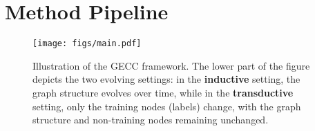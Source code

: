 


\section{Method Pipeline}
\begin{figure}[h]
    \centering
    \texttt{[image: figs/main.pdf]}
    \caption{Illustration of the GECC framework. The lower part of the figure depicts the two evolving settings: in the \textbf{inductive} setting, the graph structure evolves over time, while in the \textbf{transductive} setting, only the training nodes (labels) change, with the graph structure and non-training nodes remaining unchanged.}

    \label{fig:main}
\end{figure}

